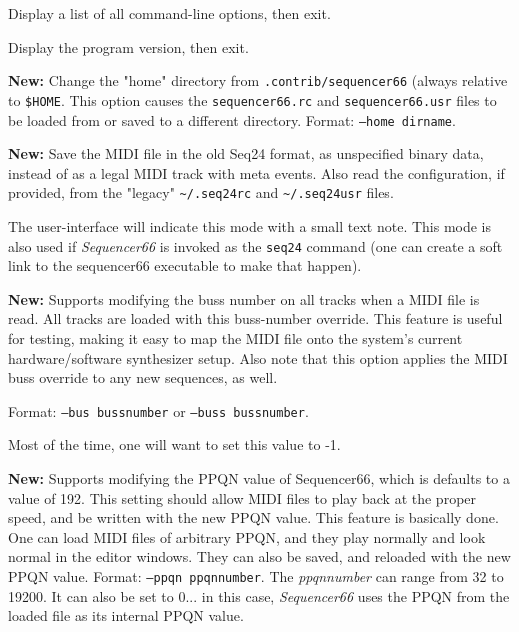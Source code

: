       Display a list of all command-line options, then exit.

      Display the program version, then exit.

      \textbf{New:}
      Change the "home" directory from \texttt{.contrib/sequencer66}
      (always relative to \texttt{\$HOME}.
      This option causes the \texttt{sequencer66.rc}
      and \texttt{sequencer66.usr} files to be loaded from or
      saved to a different directory.
      Format: \texttt{--home dirname}.

      \textbf{New:}
      Save the MIDI file in the old Seq24 format, as unspecified
      binary data, instead of as a legal MIDI track with meta events.
      Also read the configuration, if provided, from the "legacy"
      \texttt{\textasciitilde/.seq24rc} and
      \texttt{\textasciitilde/.seq24usr} files.


      The user-interface will indicate this mode with a small text
      note.
      This mode is also used if \textsl{Sequencer66} is invoked as the
      \texttt{seq24} command (one can create a soft link to the sequencer66
      executable to make that happen).

      \textbf{New:}
      Supports modifying the buss number on all tracks when a MIDI file is
      read.  All tracks are loaded with this buss-number override.  This
      feature is useful for testing, making it easy to map the MIDI file onto
      the system's current hardware/software synthesizer setup.
      Also note that this option applies the MIDI buss override to any new
      sequences, as well.

      Format: \texttt{--bus bussnumber} or
      \texttt{--buss bussnumber}.

      Most of the time, one will want to set this value to -1.

      \textbf{New:}
      Supports modifying the PPQN value of Sequencer66, which is
      defaults to a value of 192.  This setting should allow MIDI files to
      play back at the proper speed, and be written with the new PPQN value.
      This feature is basically done.
      One can load MIDI files of arbitrary PPQN, and they
      play normally and look normal in the editor windows.  They can also be
      saved, and reloaded with the new PPQN value. 
      Format: \texttt{--ppqn ppqnnumber}.
      The \textsl{ppqnnumber} can range from 32 to 19200.
      It can also be set to 0... in this case, \textsl{Sequencer66}
      uses the PPQN from the loaded file as its internal PPQN value.

